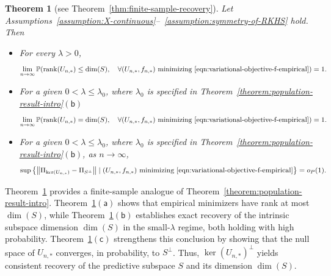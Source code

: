\documentclass[sn-mathphys-num]{sn-jnl}%
\numberwithin{equation}{section}
\newcommand{\norm}[1]{\left\|{#1}\right\|} %
\renewcommand{\P}{\mathbb{P}}
\newcommand{\rank}{{\rm rank}}
\theoremstyle{thmstyleone}%
\newtheorem{theorem}{Theorem}%
\theoremstyle{thmstyletwo}%
\theoremstyle{thmstylethree}%
\begin{document}
\vspace{.5em} 
\begin{theorem}[see Theorem~\ref{thm:finite-sample-recovery}]
\label{theorem:finite-sample-result-intro}
Let Assumptions~\ref{assumption:X-continuous}--~\ref{assumption:symmetry-of-RKHS} 
hold.  Then \vspace{.5em} 
\begin{itemize}
\item[$\mathsf{(a)}$] 
For every $\lambda > 0$, 
\begin{equation*}
	\lim_{n \to \infty} \P( \rank(U_{n, *}) \le \dim(S),~~~\forall (U_{n, *}, f_{n, *})~\text{minimizing~\eqref{eqn:variational-objective-f-empirical}}) = 1.
\end{equation*}
\item[$\mathsf{(b)}$] 
For a given $0 < \lambda \le \lambda_0$, where $\lambda_0$ is specified in Theorem~\ref{theorem:population-result-intro}$\mathsf{(b)}$
\begin{equation*}
	\lim_{n \to \infty} \P( \rank(U_{n, *}) = \dim(S),~~~\forall (U_{n, *}, f_{n, *})~\text{minimizing~\eqref{eqn:variational-objective-f-empirical}}) = 1.\end{equation*} 
\item[$\mathsf{(c)}$]
For a given $0 < \lambda \le \lambda_0$, where $\lambda_0$ is specified in Theorem~\ref{theorem:population-result-intro}$\mathsf{(b)}$, as $n \to \infty$,
\begin{equation*}
	\sup\left\{\norm{\Pi_{\ker(U_{n, *})}- \Pi_{S^\perp}} \mid (U_{n, *}, f_{n, *})~\text{minimizing~\eqref{eqn:variational-objective-f-empirical}} \right\} = o_P(1).
\end{equation*}  
\end{itemize}
\end{theorem} 

Theorem~\ref{theorem:finite-sample-result-intro} provides a finite-sample analogue of 
Theorem~\ref{theorem:population-result-intro}. Theorem~\ref{theorem:finite-sample-result-intro}$\mathsf{(a)}$ 
shows that empirical minimizers have rank at most $\dim(S)$, while
Theorem~\ref{theorem:finite-sample-result-intro}$\mathsf{(b)}$ 
establishes exact recovery of the intrinsic subspace dimension $\dim(S)$ in the small-$\lambda$
regime, both holding with high probability. Theorem~\ref{theorem:finite-sample-result-intro}$\mathsf{(c)}$ 
strengthens this conclusion by showing that the null space of $U_{n, *}$ converges, 
in probability, to $S^\perp$. Thus, $\ker(U_{n, *})^\perp$ yields consistent recovery of the predictive subspace $S$ and its dimension $\dim(S)$.
\end{document}
